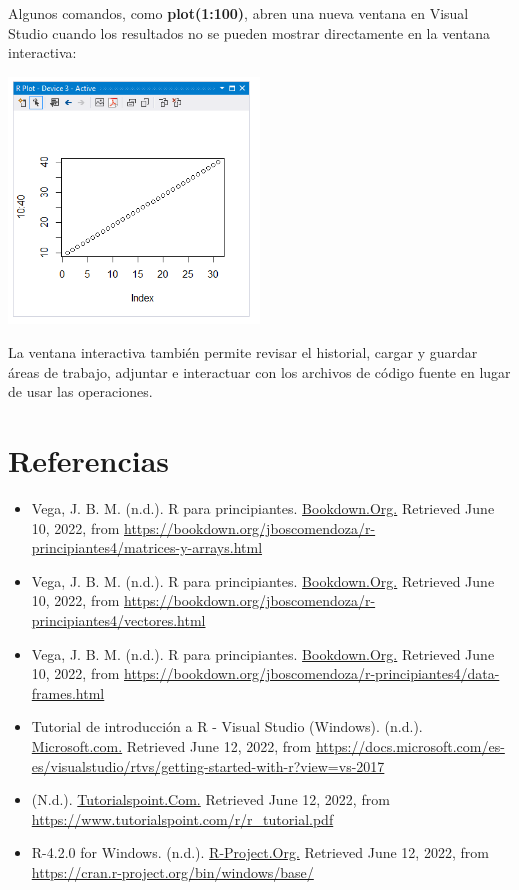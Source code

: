 \documentclass{article}
\begin{document}
Algunos comandos, como \textbf{plot(1:100)}, abren una nueva ventana en Visual Studio cuando los resultados no se pueden mostrar directamente en la ventana interactiva:
\begin{center}
\includegraphics[width=0.5\textwidth]{anúgwe/C5.PNG}
\end{center}
La ventana interactiva también permite revisar el historial, cargar y guardar áreas de trabajo, adjuntar e interactuar con los archivos de código fuente en lugar de usar las operaciones.\\


\section{Referencias}
\begin{itemize}
    \item Vega, J. B. M. (n.d.). R para principiantes. \url{Bookdown.Org.} Retrieved June 10, 2022, from \url{https://bookdown.org/jboscomendoza/r-principiantes4/matrices-y-arrays.html}
    \item Vega, J. B. M. (n.d.). R para principiantes.
    \url{Bookdown.Org.}  Retrieved June 10, 2022, from \url{https://bookdown.org/jboscomendoza/r-principiantes4/vectores.html}
    \item Vega, J. B. M. (n.d.). R para principiantes.
    \url{Bookdown.Org.} Retrieved June 10, 2022, from \url{https://bookdown.org/jboscomendoza/r-principiantes4/data-frames.html}
    \item Tutorial de introducción a R - Visual Studio (Windows). (n.d.).
    \url{Microsoft.com.} Retrieved June 12, 2022, from \url{https://docs.microsoft.com/es-es/visualstudio/rtvs/getting-started-with-r?view=vs-2017}
    \item (N.d.).
    \url{Tutorialspoint.Com.} Retrieved June 12, 2022, from \url{https://www.tutorialspoint.com/r/r_tutorial.pdf}
    \item R-4.2.0 for Windows. (n.d.). 
    \url{R-Project.Org.} Retrieved June 12, 2022, from 
    \url{https://cran.r-project.org/bin/windows/base/}
\end{itemize}
\end{document}
